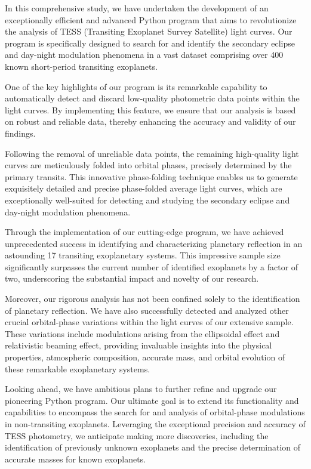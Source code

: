 \documentclass{article}
\begin{document}
    In this comprehensive study, we have undertaken the development of an exceptionally efficient and advanced Python program that aims to revolutionize the analysis of TESS (Transiting Exoplanet Survey Satellite) light curves. Our program is specifically designed to search for and identify the secondary eclipse and day-night modulation phenomena in a vast dataset comprising over 400 known short-period transiting exoplanets.

    One of the key highlights of our program is its remarkable capability to automatically detect and discard low-quality photometric data points within the light curves. By implementing this feature, we ensure that our analysis is based on robust and reliable data, thereby enhancing the accuracy and validity of our findings.

    Following the removal of unreliable data points, the remaining high-quality light curves are meticulously folded into orbital phases, precisely determined by the primary transits. This innovative phase-folding technique enables us to generate exquisitely detailed and precise phase-folded average light curves, which are exceptionally well-suited for detecting and studying the secondary eclipse and day-night modulation phenomena.

    Through the implementation of our cutting-edge program, we have achieved unprecedented success in identifying and characterizing planetary reflection in an astounding 17 transiting exoplanetary systems. This impressive sample size significantly surpasses the current number of identified exoplanets by a factor of two, underscoring the substantial impact and novelty of our research.

    Moreover, our rigorous analysis has not been confined solely to the identification of planetary reflection. We have also successfully detected and analyzed other crucial orbital-phase variations within the light curves of our extensive sample. These variations include modulations arising from the ellipsoidal effect and relativistic beaming effect, providing invaluable insights into the physical properties, atmospheric composition, accurate mass, and orbital evolution of these remarkable exoplanetary systems.

    Looking ahead, we have ambitious plans to further refine and upgrade our pioneering Python program. Our ultimate goal is to extend its functionality and capabilities to encompass the search for and analysis of orbital-phase modulations in non-transiting exoplanets. Leveraging the exceptional precision and accuracy of TESS photometry, we anticipate making more discoveries, including the identification of previously unknown exoplanets and the precise determination of accurate masses for known exoplanets.
\end{document}
